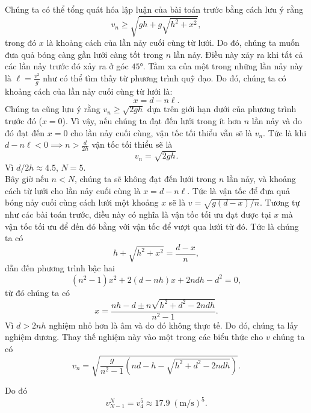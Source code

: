 \begin{solution}
Chúng ta có thể tổng quát hóa lập luận của bài toán trước bằng cách lưu ý rằng
\[v_n\geq\sqrt{gh+g\sqrt{h^2+x^2}},\]
trong đó $x$ là khoảng cách của lần nảy cuối cùng từ lưới. Do đó, chúng ta muốn đưa quả bóng càng gần lưới càng tốt trong $n$ lần nảy. Điều này xảy ra khi tất cả các lần nảy trước đó xảy ra ở góc $\ang{45}$. Tầm xa của một trong những lần nảy này là $\ell=\frac{v^2}{g}$ như có thể tìm thấy từ phương trình quỹ đạo. Do đó, chúng ta có khoảng cách của lần nảy cuối cùng từ lưới là:
\[x=d-n\ell.\]
Chúng ta cũng lưu ý rằng $v_n\geq \sqrt{2gh}$ dựa trên giới hạn dưới của phương trình trước đó ($x=0$). Vì vậy, nếu chúng ta đạt đến lưới trong ít hơn $n$ lần nảy và do đó đạt đến $x=0$ cho lần nảy cuối cùng, vận tốc tối thiểu vẫn sẽ là $v_n$. Tức là khi $d-n\ell < 0 \implies n>\frac{d}{2h}$ vận tốc tối thiểu sẽ là
\[v_n=\sqrt{2gh}.\]
Vì $d/2h\approx 4.5$, $N=5.$\\

Bây giờ nếu $n<N$, chúng ta sẽ không đạt đến lưới trong $n$ lần nảy, và khoảng cách từ lưới cho lần nảy cuối cùng là $x=d-n\ell.$ Tức là vận tốc để đưa quả bóng nảy cuối cùng cách lưới một khoảng $x$ sẽ là $v=\sqrt{g(d-x)/n}.$ Tương tự như các bài toán trước, điều này có nghĩa là vận tốc tối ưu đạt được tại $x$ mà vận tốc tối ưu để đến đó bằng với vận tốc để vượt qua lưới từ đó. Tức là chúng ta có
\[h+\sqrt{h^2+x^2}=\frac{d-x}{n},\]
dẫn đến phương trình bậc hai
\[(n^2-1)x^2+2(d-nh)x+2ndh-d^2=0,\]
từ đó chúng ta có
\[x=\frac{nh-d\pm n\sqrt{h^2+d^2-2ndh}}{n^2-1}.\]
Vì $d>2nh$ nghiệm nhỏ hơn là âm và do đó không thực tế. Do đó, chúng ta lấy nghiệm dương. Thay thế nghiệm này vào một trong các biểu thức cho $v$ chúng ta có
\[v_n=\sqrt{\frac{g}{n^2-1}\left(nd-h-\sqrt{h^2+d^2-2ndh}\right)}.\]

Do đó
\[v_{N-1}^N=v_4^5\approx\boxed{17.9\;(\mathrm{m/s})^5.}\]
\end{solution}
